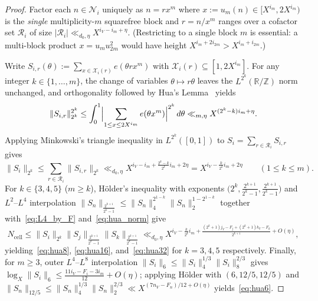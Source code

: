 \documentclass[11pt,a4paper]{amsart}
\theoremstyle{plain}
\theoremstyle{definition}
\theoremstyle{remark}
\newcommand{\Z}{\mathbb{Z}}
\newcommand{\R}{\mathbb{R}}
\begin{document}
\begin{proof}
Factor each $n \in \mathcal{N}_i$ uniquely as $n = r x^m$ where $x := u_m(n) \in [X^{i_m}, 2 X^{i_m})$ is the \emph{single} multiplicity-$m$ squarefree block and $r = n/x^m$ ranges over a cofactor set $\mathcal{R}_i$ of size $|\mathcal{R}_i| \ll_{d_0,\eta} X^{i_V - i_m + \eta}$. (Restricting to a single block $m$ is essential: a multi-block product $x = u_m u_{2m}^2$ would have height $X^{i_m + 2 i_{2m}} > X^{i_m + i_{2m}}$.)

Write $S_{i,r}(\theta) := \sum_{x \in \mathcal{X}_i(r)} e(\theta r x^m)$ with $\mathcal{X}_i(r) \subseteq [1, 2 X^{i_m}]$. For any integer $k \in \{1,\dots,m\}$, the change of variables $\theta \mapsto r\theta$ leaves the $L^{2^k}(\R/\Z)$ norm unchanged, and orthogonality followed by Hua's Lemma~\cite{Hua1938} yields
\[
  \|S_{i,r}\|_{2^k}^{2^k}
  \le \int_0^1 \Bigl|\sum_{1 \le x \le 2 X^{i_m}} e(\theta x^m)\Bigr|^{2^k}\,d\theta
  \ll_{m,\eta} X^{(2^k - k) i_m + \eta}.
\]
Applying Minkowski's triangle inequality in $L^{2^k}([0,1])$ to $S_i = \sum_{r \in \mathcal{R}_i} S_{i,r}$ gives
\begin{equation}\label{eq:hua_norm}
  \|S_i\|_{2^k} \le \sum_{r \in \mathcal{R}_i} \|S_{i,r}\|_{2^k}
  \ll_{d_0,\eta} X^{i_V - i_m + \frac{2^k - k}{2^k} i_m + 2\eta}
  = X^{i_V - \frac{k}{2^k} i_m + 2\eta} \qquad (1 \le k \le m).
\end{equation}
For $k \in \{3, 4, 5\}$ ($m \ge k$), H\"older's inequality with exponents $\bigl(2^k, \frac{2^{k+1}}{2^k-1}, \frac{2^{k+1}}{2^k-1}\bigr)$ and $L^2$--$L^4$ interpolation $\|S_n\|_{\frac{2^{k+1}}{2^k-1}} \le \|S_n\|_4^{2^{1-k}} \|S_n\|_2^{1-2^{1-k}}$ together with~\eqref{eq:L4_by_F} and~\eqref{eq:hua_norm} give
\[
  N_{\mathrm{cell}} \le \|S_i\|_{2^k} \|S_j\|_{\frac{2^{k+1}}{2^k-1}} \|S_k\|_{\frac{2^{k+1}}{2^k-1}}
  \ll_{d_0,\eta} X^{i_V - \frac{k}{2^k} i_m + \frac{(2^k+1) j_V - F_j + (2^k+1) k_V - F_k}{2^{k+1}} + O(\eta)},
\]
yielding~\eqref{eq:hua8}, \eqref{eq:hua16}, and~\eqref{eq:hua32} for $k = 3, 4, 5$ respectively. Finally, for $m \ge 3$, outer $L^4$--$L^8$ interpolation $\|S_i\|_6 \le \|S_i\|_4^{1/3} \|S_i\|_8^{2/3}$ gives $\log_X \|S_i\|_6 \le \frac{11 i_V - F_i - 3 i_m}{12} + O(\eta)$; applying H\"older with $(6, 12/5, 12/5)$ and $\|S_n\|_{12/5} \le \|S_n\|_4^{1/3} \|S_n\|_2^{2/3} \ll X^{(7 n_V - F_n)/12 + O(\eta)}$ yields~\eqref{eq:hua6}.
\end{proof}
\end{document}

